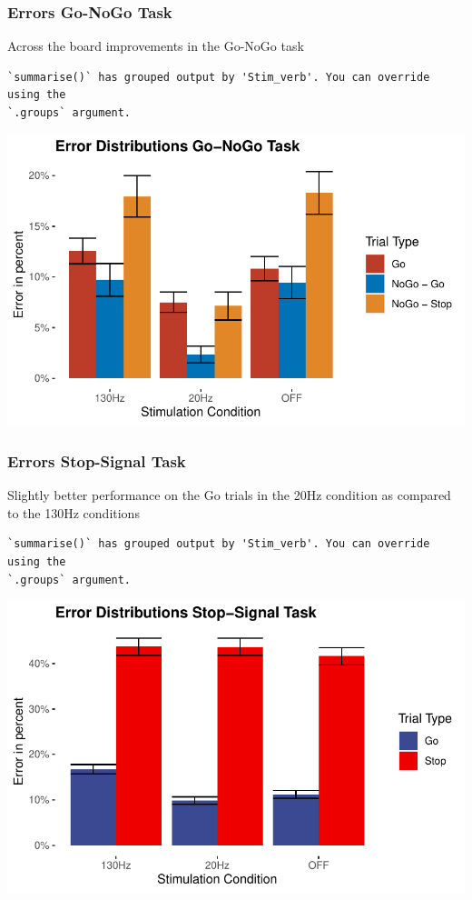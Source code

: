 \documentclass[
  letterpaper,
  DIV=11,
  numbers=noendperiod]{scrartcl}
\begin{document}
\hypertarget{errors-go-nogo-task}{%
\subsubsection{Errors Go-NoGo Task}\label{errors-go-nogo-task}}

Across the board improvements in the Go-NoGo task

\begin{verbatim}
`summarise()` has grouped output by 'Stim_verb'. You can override using the
`.groups` argument.
\end{verbatim}

\includegraphics{MF_01_Modelfree_Analysis_files/figure-pdf/unnamed-chunk-9-1.pdf}

\hypertarget{errors-stop-signal-task}{%
\subsubsection{Errors Stop-Signal Task}\label{errors-stop-signal-task}}

Slightly better performance on the Go trials in the 20Hz condition as
compared to the 130Hz conditions

\begin{verbatim}
`summarise()` has grouped output by 'Stim_verb'. You can override using the
`.groups` argument.
\end{verbatim}

\includegraphics{MF_01_Modelfree_Analysis_files/figure-pdf/unnamed-chunk-10-1.pdf}
\end{document}

